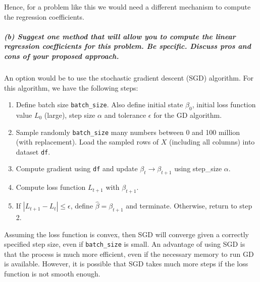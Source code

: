 \documentclass[11pt, english]{article}
\begin{document}
Hence, for a problem like this we would need a different mechanism to
compute the regression coefficients.

    \hypertarget{b-suggest-one-method-that-will-allow-you-to-compute-the-linear-regression-coefficients-for-this-problem.-be-specific.-discuss-pros-and-cons-of-your-proposed-approach.}{%
\subparagraph{(b) Suggest one method that will allow you to compute the
linear regression coefficients for this problem. Be specific. Discuss
pros and cons of your proposed
approach.\\[2ex]}\label{b-suggest-one-method-that-will-allow-you-to-compute-the-linear-regression-coefficients-for-this-problem.-be-specific.-discuss-pros-and-cons-of-your-proposed-approach.}}

    An option would be to use the stochastic gradient descent (SGD)
algorithm. For this algorithm, we have the following steps:
\begin{enumerate}
	\item Define batch size \texttt{batch\_size}. Also define initial state
\(\beta_0\), initial loss function value \(L_0\) (large), step size
\(\alpha\) and tolerance \(\epsilon\) for the GD algorithm.

	\item Sample randomly \texttt{batch\_size} many numbers between 0 and 100
million (with replacement). Load the sampled rows of \(X\) (including
all columns) into dataset \texttt{df}.

	\item Compute gradient using \texttt{df} and update
\(\beta_t \to \beta_{t+1}\) using step\_size \(\alpha\).

	\item Compute loss function \(L_{t+1}\) with \(\beta_{t+1}\).

	\item If \(|L_{t+1} - L_{t}| \leq \epsilon\), define
\(\hat{\beta} = \beta_{t+1}\) and terminate. Otherwise, return to step
2.
\end{enumerate}

Assuming the loss function is convex, then SGD will converge given a
correctly specified step size, even if \texttt{batch\_size} is small. An
advantage of using SGD is that the process is much more efficient, even
if the necessary memory to run GD is available. However, it is possible
that SGD takes much more steps if the loss function is not smooth
enough.
\end{document}
